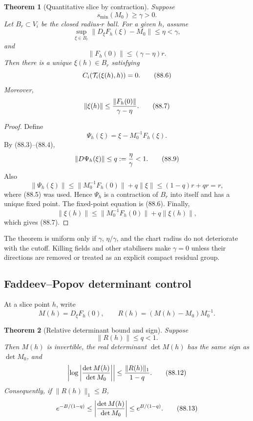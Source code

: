 \documentclass[11pt]{article}
\newtheorem{theorem}{Theorem}[section]
\begin{document}
\begin{theorem}[Quantitative slice by contraction]
\label{thm:v11v88-slice}
Suppose
\[
                         s_{\min}(M_0)\ge\gamma>0.            \tag{88.3}
\]
Let \(B_r\subset V_i\) be the closed radius-\(r\) ball.  For a given
\(h\), assume
\[
 \sup_{\xi\in B_r}\|D_\xi F_h(\xi)-M_0\|\le\eta<\gamma,       \tag{88.4}
\]
and
\[
                              \|F_h(0)\|\le(\gamma-\eta)r.    \tag{88.5}
\]
Then there is a unique \(\xi(h)\in B_r\) satisfying
\[
                              C_i({\cal T}_i(\xi(h),h))=0.    \tag{88.6}
\]
Moreover,
\[
                              \|\xi(h)\|
                              \le{\|F_h(0)\|\over\gamma-\eta}.\tag{88.7}
\]
\end{theorem}

\begin{proof}
Define
\[
                              \Psi_h(\xi)=\xi-M_0^{-1}F_h(\xi).
                                                                    \tag{88.8}
\]
By (88.3)--(88.4),
\[
                              \|D\Psi_h(\xi)\|
                              \le q:={\eta\over\gamma}<1.     \tag{88.9}
\]
Also
\[
 \|\Psi_h(\xi)\|
 \le\|M_0^{-1}F_h(0)\|+q\|\xi\|
 \le(1-q)r+qr=r,
\]
where (88.5) was used.  Hence \(\Psi_h\) is a contraction of \(B_r\)
into itself and has a unique fixed point.  The fixed-point equation
is (88.6).  Finally,
\[
 \|\xi(h)\|
 \le\|M_0^{-1}F_h(0)\|+q\|\xi(h)\|,
\]
which gives (88.7).
\end{proof}

The theorem is uniform only if \(\gamma\), \(\eta/\gamma\), and the
chart radius do not deteriorate with the cutoff.  Killing fields and
other stabilisers make \(\gamma=0\) unless their directions are
removed or treated as an explicit compact residual group.

\subsection{Faddeev--Popov determinant control}

At a slice point \(h\), write
\[
                         M(h)=D_\xi F_h(0),\qquad
                         R(h)=(M(h)-M_0)M_0^{-1}.            \tag{88.10}
\]

\begin{theorem}[Relative determinant bound and sign]
\label{thm:v11v88-FP}
Suppose
\[
                              \|R(h)\|\le q<1.                \tag{88.11}
\]
Then \(M(h)\) is invertible, the real determinant
\(\det M(h)\) has the same sign as \(\det M_0\), and
\[
 \left|\log\left|
       {\det M(h)\over\det M_0}\right|\right|
 \le{\|R(h)\|_1\over1-q}.                                   \tag{88.12}
\]
Consequently, if \(\|R(h)\|_1\le B\),
\[
 e^{-B/(1-q)}
 \le\left|{\det M(h)\over\det M_0}\right|
 \le e^{B/(1-q)}.                                           \tag{88.13}
\]
\end{theorem}
\end{document}

